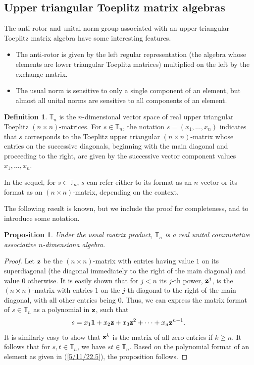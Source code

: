 \documentclass{amsart}
\numberwithin{equation}{section}
\newtheorem{proposition}[theorem]{Proposition}
\theoremstyle{definition}
\newtheorem{definition}[theorem]{Definition}
\numberwithin{theorem}{section}
\begin{document}
\subsection{Upper triangular Toeplitz matrix algebras}

The anti-rotor and unital norm group associated with an upper triangular Toeplitz matrix algebra have some interesting features.
\begin{itemize}\item The anti-rotor is given by the left regular representation (the algebra whose elements are lower triangular Toeplitz matrices) multiplied on the left by the exchange matrix. \item The usual norm is sensitive to only a single component of an element, but almost all unital norms are sensitive to all components of an element.\end{itemize}


 \begin{definition}\label{5/4/22.1} $\mathbb{T}_n$ is the $n$-dimensional vector space of real upper triangular Toeplitz $(n\times n)$-matrices. For $s\in \mathbb{T}_n$, the notation $s=(x_1,\dots,x_n)$ indicates that $s$ corresponds to the Toeplitz upper triangular $(n\times n)$-matrix whose entries on the successive diagonals, beginning with the main diagonal and proceeding to the right, are given by the successive vector component values $x_1,\dots,x_n$.   
\end{definition}

In the sequel, for $s\in \mathbb{T}_n$, $s$ can refer either to its format as an $n$-vector or its format as an $(n\times n)$-matrix, depending on the context.


The following result is known, but we include the proof for completeness, and to introduce some notation.  



 \begin{proposition}\label{5/10/22.1} Under the usual matrix product, $\mathbb{T}_n$ is a real unital commutative associative $n$-dimensiona algebra.\end{proposition} 
 
 \begin{proof}
Let ${\bf z}$ be the $(n \times n)$-matrix with entries having value $1$ on its superdiagonal  (the diagonal immediately to the right of the main diagonal) and value $0$ otherwise.  It is easily shown that for $j<n$ its $j$-th power, ${\bf z}^j$, is the $(n\times n)$-matrix with entries $1$ on the $j$-th diagonal to the right of the main diagonal, with all other entries being $0$.   Thus, we can express the matrix format of $s\in\mathbb{T}_n$ as a polynomial in ${\bf z}$, such that
\begin{equation}\label{5/11/22.5} s = x_1 {\bf 1} + x_2 {\bf z} + x_3 {\bf z}^2 + \cdots + x_n {\bf z}^{n-1}.\end{equation}  It is similarly easy to show that ${\bf z}^k$ is the matrix of all zero entries if $k\ge n$.  It follows that for $s,t\in \mathbb{T}_n$, we have $st\in \mathbb{T}_n$.   Based on the polynomial format of an element as given in (\ref{5/11/22.5}), the proposition follows.
 \end{proof}
 
\end{document}
